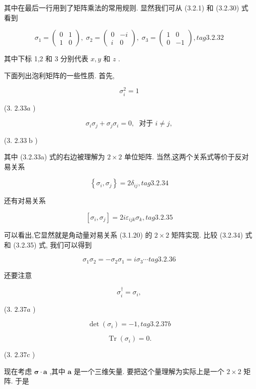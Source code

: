 其中在最后一行用到了矩阵乘法的常用规则. 显然我们可从 (3.2.1) 和 (3.2.30) 式看到

$$
{\sigma }_{1} = \left( \begin{array}{ll} 0 & 1 \\ 1 & 0 \end{array}\right) ,\;{\sigma }_{2} = \left( \begin{matrix} 0 & - i \\ i & 0 \end{matrix}\right) ,\;{\sigma }_{3} = \left( \begin{matrix} 1 & 0 \\ 0 & - 1 \end{matrix}\right) , tag{3. 2.32}
$$

其中下标 1,2 和 3 分别代表 $x, y$ 和 $z$ .

下面列出泡利矩阵的一些性质. 首先,

$$
{\sigma }_{i}^{2} = 1
$$

(3. ${2.33a}$ )

$$
{\sigma }_{i}{\sigma }_{j} + {\sigma }_{j}{\sigma }_{i} = 0,\;\text{ 对于 }i \neq j,
$$

(3. ${2.33}\mathrm{\;b}$ )

其中 (3.2.33a) 式的右边被理解为 $2 \times 2$ 单位矩阵. 当然,这两个关系式等价于反对易关系

$$
\left\{ {{\sigma }_{i},{\sigma }_{j}}\right\} = 2{\delta }_{ij}, tag{3. 2.34}
$$

还有对易关系

$$
\left\lbrack {{\sigma }_{i},{\sigma }_{j}}\right\rbrack = {2i}{\varepsilon }_{ijk}{\sigma }_{k}, tag{3. 2.35}
$$

可以看出,它显然就是角动量对易关系 (3.1.20) 的 $2 \times 2$ 矩阵实现. 比较 (3.2.34) 式和 (3.2.35) 式, 我们可以得到

$$
{\sigma }_{1}{\sigma }_{2} = - {\sigma }_{2}{\sigma }_{1} = i{\sigma }_{3}\cdots tag{3. 2.36}
$$

还要注意

$$
{\sigma }_{i}^{ \dagger } = {\sigma }_{i},
$$

(3. ${2.37a}$ )

$$
\det \left( {\sigma }_{i}\right) = - 1, tag{3. 2.37b}
$$

$$
\operatorname{Tr}\left( {\sigma }_{i}\right) = 0.
$$

(3. ${2.37}\mathrm{c}$ )

现在考虑 $\mathbf{\sigma } \cdot \mathbf{a}$ ,其中 $\mathbf{a}$ 是一个三维矢量. 要把这个量理解为实际上是一个 $2 \times 2$ 矩阵. 于是

